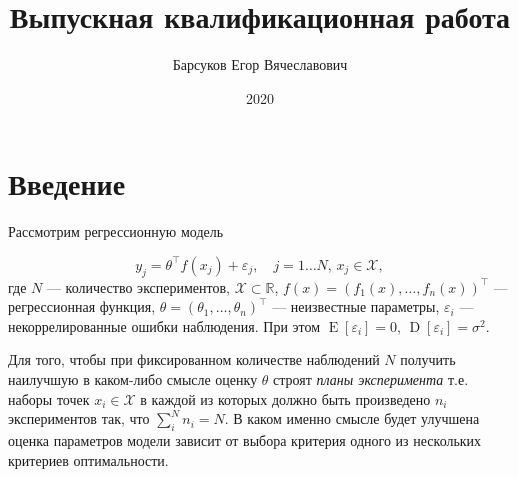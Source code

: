 \documentclass[specialist,
               substylefile = spbu.rtx,
               subf,href,colorlinks=true, 12pt]{disser}
\theoremstyle{definition}
\DeclareMathOperator*{\E}{\mathrm{E}}
\DeclareMathOperator*{\D}{\mathrm{D}}
\begin{document}

\title{Выпускная квалификационная работа}


\author{Барсуков Егор Вячеславович}



\date{2020}

\maketitle

\tableofcontents

\chapter*{Введение}

  Рассмотрим регрессионную модель

  \begin{equation}
  \label{eq:regres}
    y_j = \theta^\top f(x_j) + \varepsilon_j, \quad j = 1 \ldots N, \, x_j \in \mathcal{X},
  \end{equation}
  где $N$ --- количество экспериментов, $\mathcal{X} \subset \mathbb{R}$, $f(x) = \left(f_1(x), \ldots, f_n(x) \right)^\top$ --- регрессионная функция, $\theta = \left( \theta_1, \ldots, \theta_n \right)^\top$ --- неизвестные параметры, $\varepsilon_i$ ---  некоррелированные ошибки наблюдения. При этом $\E [\varepsilon_i] = 0$, $\D [\varepsilon_i] = \sigma^2$.
  
  Для того, чтобы при фиксированном количестве наблюдений $N$ получить наилучшую в каком-либо смысле оценку $\theta$ строят \textit{планы эксперимента} т.е. наборы точек $x_i \in \mathcal{X}$ в каждой из которых должно быть произведено $n_i$ экспериментов так, что $\sum^N_i n_i = N$. В каком именно смысле будет улучшена оценка параметров модели зависит от выбора критерия одного из нескольких критериев оптимальности.
  
\end{document}
